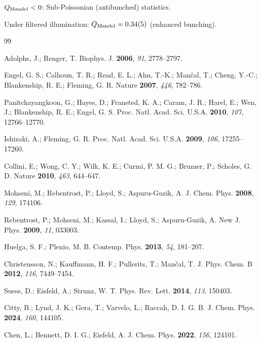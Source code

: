 \documentclass[11pt,a4paper]{article}
\begin{document}
$Q_{\rm Mandel} < 0$: Sub-Poissonian (antibunched) statistics.

Under filtered illumination: $Q_{\rm Mandel} = 0.34(5)$ (enhanced bunching).


\begin{thebibliography}{99}

Adolphs, J.; Renger, T. Biophys. J. \textbf{2006}, \textit{91}, 2778--2797.

Engel, G. S.; Calhoun, T. R.; Read, E. L.; Ahn, T.-K.; Man\v{c}al, T.; Cheng, Y.-C.; Blankenship, R. E.; Fleming, G. R. Nature \textbf{2007}, \textit{446}, 782--786.

Panitchayangkoon, G.; Hayes, D.; Fransted, K. A.; Caram, J. R.; Harel, E.; Wen, J.; Blankenship, R. E.; Engel, G. S. Proc. Natl. Acad. Sci. U.S.A. \textbf{2010}, \textit{107}, 12766--12770.

Ishizaki, A.; Fleming, G. R. Proc. Natl. Acad. Sci. U.S.A. \textbf{2009}, \textit{106}, 17255--17260.

Collini, E.; Wong, C. Y.; Wilk, K. E.; Curmi, P. M. G.; Brumer, P.; Scholes, G. D. Nature \textbf{2010}, \textit{463}, 644--647.

Mohseni, M.; Rebentrost, P.; Lloyd, S.; Aspuru-Guzik, A. J. Chem. Phys. \textbf{2008}, \textit{129}, 174106.

Rebentrost, P.; Mohseni, M.; Kassal, I.; Lloyd, S.; Aspuru-Guzik, A. New J. Phys. \textbf{2009}, \textit{11}, 033003.

Huelga, S. F.; Plenio, M. B. Contemp. Phys. \textbf{2013}, \textit{54}, 181--207.

Christensson, N.; Kauffmann, H. F.; Pullerits, T.; Man\v{c}al, T. J. Phys. Chem. B \textbf{2012}, \textit{116}, 7449--7454.

Suess, D.; Eisfeld, A.; Strunz, W. T. Phys. Rev. Lett. \textbf{2014}, \textit{113}, 150403.

Citty, B.; Lynd, J. K.; Gera, T.; Varvelo, L.; Raccah, D. I. G. B. J. Chem. Phys. \textbf{2024}, \textit{160}, 144105.

Chen, L.; Bennett, D. I. G.; Eisfeld, A. J. Chem. Phys. \textbf{2022}, \textit{156}, 124101.


\end{thebibliography}
\end{document}
